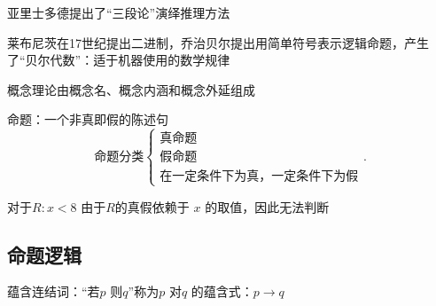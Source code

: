 \begin{notation}
    亚里士多德提出了“三段论”演绎推理方法

    莱布尼茨在17世纪提出二进制，乔治贝尔提出用简单符号表示逻辑命题，产生了“贝尔代数”：适于机器使用的数学规律
\end{notation}
概念理论由概念名、概念内涵和概念外延组成
\begin{notation}
    命题：一个非真即假的陈述句
    \[
        \text{命题分类}
        \begin{cases}
            \text{真命题}\\
            \text{假命题}\\
            \text{在一定条件下为真，一定条件下为假}
        \end{cases}
    .\] 

    对于$R: x<8$ 由于$R$的真假依赖于 $x$ 的取值，因此无法判断
\end{notation}
\subsection{命题逻辑}%
\label{sub:命题逻辑}
\begin{notation}
    蕴含连结词：“若$p$ 则$q$”称为$p$ 对$q$ 的蕴含式：$p\to q$
\end{notation}

